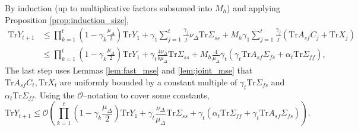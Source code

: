 By induction (up to multiplicative factors subsumed into $M_h$) and applying Proposition \ref{prop:induction_size},
\begin{align*}
    \mathrm{Tr} Y_{t+1} 
    &
    \leq  
    \prod_{k=1}^t \left(1 - \gamma_k \frac{\mu_\Delta}{2}\right) \mathrm{Tr} Y_1
    + \gamma_1 \sum_{j=1}^t \frac{\gamma_j}{j} \nu_\Delta \mathrm{Tr} \Sigma_{ss} 
    + M_h \gamma_1 \sum_{j=1}^t \frac{\gamma_j}{j} \left(\mathrm{Tr} A_{sf} C_j  + \mathrm{Tr} X_j\right) 
    \\
    & \leq 
    \prod_{k=1}^t \left(1 - \gamma_k \frac{\mu_\Delta}{2}\right) \mathrm{Tr} Y_1
    + \gamma_t \frac{4\nu_\Delta}{b \mu_\Delta}  \mathrm{Tr} \Sigma_{ss} 
    + M_h \frac{4}{\mu_\Delta} \gamma_t \left(\gamma_t \mathrm{Tr} A_{sf} \Sigma_{fs}  + \alpha_t \mathrm{Tr} \Sigma_{ff} 
    \right) 
    ,
\end{align*}
The last step uses Lemmas \ref{lem:fast_mse} and \ref{lem:joint_mse} that $\mathrm{Tr} A_{sf} C_t , \mathrm{Tr} X_t$ are uniformly bounded by a constant multiple of $\gamma_t \mathrm{Tr} \Sigma_{fs}$ and $\alpha_t \mathrm{Tr} \Sigma_{ff}$.
Using the $\mathcal{O}$--notation to cover some constants,
\begin{equation}
    \mathrm{Tr} Y_{t+1} \leq \mathcal{O}\left(
        \prod_{k=1}^t \left(1 - \gamma_k \frac{\mu_\Delta}{2}\right) \mathrm{Tr} Y_1
        + \gamma_t \frac{\nu_\Delta}{\mu_\Delta} \mathrm{Tr} \Sigma_{ss} + \gamma_t (\alpha_t \mathrm{Tr} \Sigma_{ff} + \gamma_t \mathrm{Tr} A_{sf} \Sigma_{fs}
        ) 
    \right) .
\end{equation}



